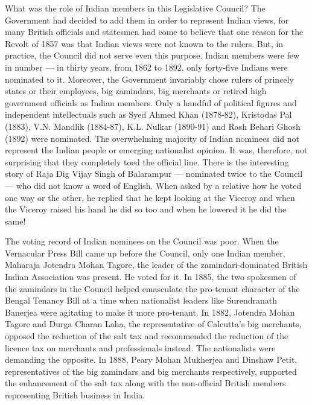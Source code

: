 What was the role of Indian members in this Legislative Council? The Government had decided to add them in order to represent Indian views, for many British officials and statesmen had come to believe that one reason for the Revolt of 1857 was that Indian views were not known to the rulers. But, in practice, the Council did not serve even this purpose. Indian members were few in number — in thirty years, from 1862 to 1892, only forty-five Indians were nominated to it. Moreover, the Government invariably chose rulers of princely states or their employees, big zamindars, big merchants or retired high government officials as Indian members. Only a handful of political figures and independent intellectuals such as Syed Ahmed Khan (1878-82), Kristodas Pal (1883), V.N. Mandlik (1884-87), K.L. Nulkar (1890-91) and Rash Behari Ghosh (1892) were nominated. The overwhelming majority of Indian nominees did not represent the Indian people or emerging nationalist opinion. It was, therefore, not surprising that they completely toed the official line. There is the interesting story of Raja Dig Vijay Singh of Balarampur — nominated twice to the Council — who did not know a word of English. When asked by a relative how he voted one way or the other, he replied that he kept looking at the Viceroy and when the Viceroy raised his hand he did so too and when he lowered it he did the same!

The voting record of Indian nominees on the Council was poor. When the Vernacular Press Bill came up before the Council, only one Indian member, Maharaja Jotendra Mohan Tagore, the leader of the zamindari-dominated British Indian Association was present. He voted for it. In 1885, the two spokesmen of the zamindars in the Council helped emasculate the pro-tenant character of the Bengal Tenancy Bill at a time when nationalist leaders like Surendranath Banerjea were agitating to make it more pro-tenant. In 1882, Jotendra Mohan Tagore and Durga Charan Laha, the representative of Calcutta’s big merchants, opposed the reduction of the salt tax and recommended the reduction of the licence tax on merchants and professionals instead. The nationalists were demanding the opposite. In 1888, Peary Mohan Mukherjea and Dinshaw Petit, representatives of the big zamindars and big merchants respectively, supported the enhancement of the salt tax along with the non-official British members representing British business in India.

